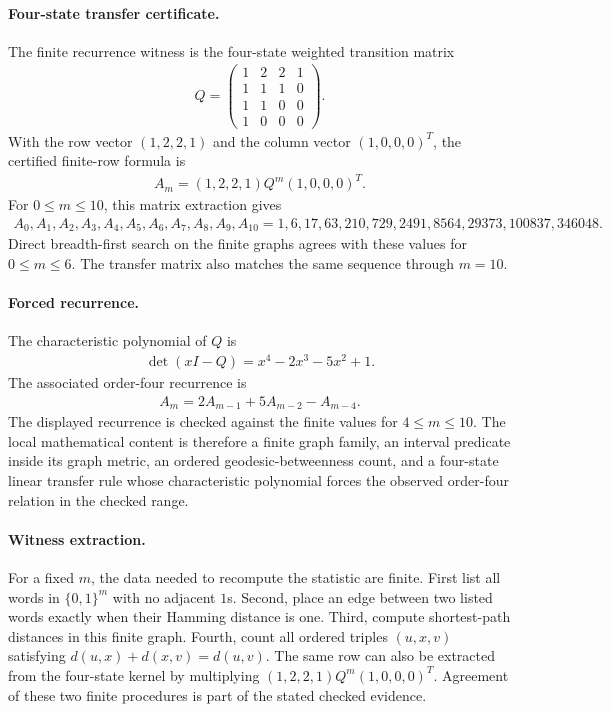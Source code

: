 \paragraph{Four-state transfer certificate.}
The finite recurrence witness is the four-state weighted transition matrix
$$
\begin{aligned}
Q=
\begin{pmatrix}
1&2&2&1\\
1&1&1&0\\
1&1&0&0\\
1&0&0&0
\end{pmatrix}.
\end{aligned}
$$
With the row vector $(1,2,2,1)$ and the column vector $(1,0,0,0)^T$, the certified finite-row formula is
$$
\begin{aligned}
A_m=(1,2,2,1)Q^m(1,0,0,0)^T.
\end{aligned}
$$
For $0 \leq m \leq 10$, this matrix extraction gives
$$
\begin{aligned}
A_0,A_1,A_2,A_3,A_4,A_5,A_6,A_7,A_8,A_9,A_{10}
=1,6,17,63,210,729,2491,8564,29373,100837,346048.
\end{aligned}
$$
Direct breadth-first search on the finite graphs agrees with these values for $0 \leq m \leq 6$. The transfer matrix also matches the same sequence through $m=10$.

\paragraph{Forced recurrence.}
The characteristic polynomial of $Q$ is
$$
\begin{aligned}
\det(xI-Q)=x^4-2x^3-5x^2+1.
\end{aligned}
$$
The associated order-four recurrence is
$$
\begin{aligned}
A_m=2A_{m-1}+5A_{m-2}-A_{m-4}.
\end{aligned}
$$
The displayed recurrence is checked against the finite values for $4 \leq m \leq 10$. The local mathematical content is therefore a finite graph family, an interval predicate inside its graph metric, an ordered geodesic-betweenness count, and a four-state linear transfer rule whose characteristic polynomial forces the observed order-four relation in the checked range.

\paragraph{Witness extraction.}
For a fixed $m$, the data needed to recompute the statistic are finite. First list all words in $\{0,1\}^m$ with no adjacent $1$s. Second, place an edge between two listed words exactly when their Hamming distance is one. Third, compute shortest-path distances in this finite graph. Fourth, count all ordered triples $(u,x,v)$ satisfying $d(u,x)+d(x,v)=d(u,v)$. The same row can also be extracted from the four-state kernel by multiplying $(1,2,2,1)Q^m(1,0,0,0)^T$. Agreement of these two finite procedures is part of the stated checked evidence.

